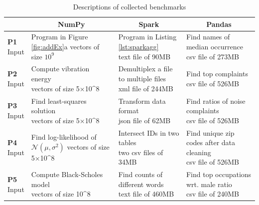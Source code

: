 \documentclass[sigconf]{acmart}\settopmatter{printfolios=true,printccs=false,printacmref=false}\setcopyright{none}
\begin{document}
\begin{table}[htbp]
  \centering
  \small
  \caption{Descriptions of collected benchmarks}
    \begin{tabular}{l|l|l|l}
    \hline
          & \multicolumn{1}{c|}{NumPy} &
          \multicolumn{1}{c|}{Spark} &
          \multicolumn{1}{c}{Pandas} \\
          \hline
    \makecell[c]{\textbf{P1} \\ Input}    &   
    \makecell[l]{Program in Figure \ref{fig:addEx}a \\ vectors of size $10^9$} &
    \makecell[l]{Program in Listing \ref{lst:sparkagg} \\ text file of 90MB}&      
    \makecell[l]{Find names of median occurrence \\ csv file of 273MB} \\
    \hline
    \makecell[c]{\textbf{P2} \\ Input}    &   
    \makecell[l]{Compute vibration energy \\ vectors of size 5×10^8 }&       
    \makecell[l]{Demultiplex a file to multiple files \\ xml file of 244MB} &
    \makecell[l]{Find top complaints \\ csv file of 526MB} \\
    \hline
    \makecell[c]{\textbf{P3} \\ Input}    &   
    \makecell[l]{Find least-squares solution \\ vectors of size 5×10^8}    &       
    \makecell[l]{Transform data format \\ json file of 62MB}&
    \makecell[l]{Find ratios of noise complaints \\ csv file of 526MB}\\
    \hline
    \makecell[c]{\textbf{P4} \\ Input}    &   
    \makecell[l]{Find log-likelihood of $\mathcal{N}(\mu,\sigma^2)$ \\ vectors of size 5×10^8}&
    \makecell[l]{Intersect IDs in two tables \\ two csv files of 34MB}&      
    \makecell[l]{Find unique zip codes after data cleaning \\ csv file of 526MB}\\
    \hline
    \makecell[c]{\textbf{P5} \\ Input}    &
    \makecell[l]{Compute Black-Scholes model \\ vectors of size 10^8}& 
    \makecell[l]{Find counts of different words \\ text file of 460MB}&     
    \makecell[l]{Find top occupations wrt. male ratio \\ csv file of 240MB}\\
    \hline
    \end{tabular}%
  \label{tab:benchmarks}%
\end{table}%
\end{document}

